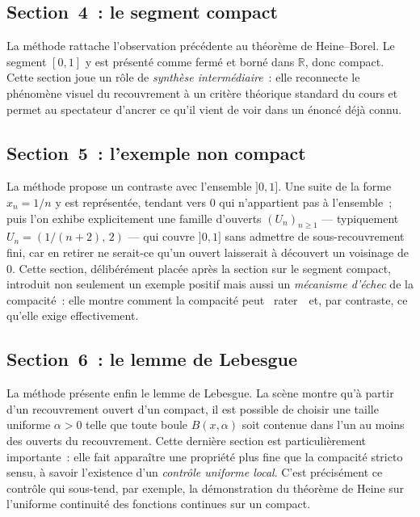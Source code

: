 \documentclass[12pt, a4paper, openany]{report}
\begin{document}
	\subsection{Section~4~: le segment compact}

	La méthode  rattache l’observation précédente au théorème de Heine--Borel. Le segment $[0,1]$ y est présenté comme fermé et borné dans $\mathbb{R}$, donc compact. Cette section joue un rôle de \emph{synthèse intermédiaire}~: elle reconnecte le phénomène visuel du recouvrement à un critère théorique standard du cours et permet au spectateur d’ancrer ce qu’il vient de voir dans un énoncé déjà connu.

	\subsection{Section~5~: l’exemple non compact}

	La méthode  propose un contraste avec l’ensemble $]0,1]$. Une suite de la forme $x_n=1/n$ y est représentée, tendant vers $0$ qui n’appartient pas à l’ensemble~; puis l’on exhibe explicitement une famille d’ouverts $(U_n)_{n\geq 1}$ — typiquement $U_n = (1/(n+2),\,2)$ — qui couvre $]0,1]$ sans admettre de sous-recouvrement fini, car en retirer ne serait-ce qu’un ouvert laisserait à découvert un voisinage de $0$. Cette section, délibérément placée après la section sur le segment compact, introduit non seulement un exemple positif mais aussi un \emph{mécanisme d’échec} de la compacité~: elle montre comment la compacité peut \og~rater~\fg\ et, par contraste, ce qu’elle exige effectivement.

	\subsection{Section~6~: le lemme de Lebesgue}

	La méthode  présente enfin le lemme de Lebesgue. La scène montre qu’à partir d’un recouvrement ouvert d’un compact, il est possible de choisir une taille uniforme $\alpha>0$ telle que toute boule $B(x,\alpha)$ soit contenue dans l’un au moins des ouverts du recouvrement. Cette dernière section est particulièrement importante~: elle fait apparaître une propriété plus fine que la compacité stricto sensu, à savoir l’existence d’un \emph{contrôle uniforme local}. C’est précisément ce contrôle qui sous-tend, par exemple, la démonstration du théorème de Heine sur l’uniforme continuité des fonctions continues sur un compact.
	
\end{document}

